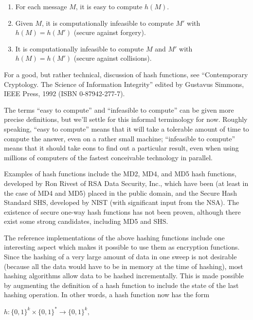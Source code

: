 \begin{enumerate}

    \item For each message $M$, it is easy to compute $h( M )$.

    \item Given $M$, it is computationally infeasible to compute $M'$ with
       $h( M ) = h( M' )$ (secure against forgery).

    \item It is computationally infeasible to compute $M$ and $M'$ with
       $h( M ) = h( M' )$ (secure against collisions).
\end{enumerate}

For a good, but rather technical, discussion of hash functions, see
``Contemporary Cryptology. The Science of Information Integrity'' edited by 
Gustavus Simmons, IEEE Press, 1992 (ISBN 0-87942-277-7).

The terms ``easy to compute'' and ``infeasible to compute'' can be given more
precise definitions, but we'll settle for this informal terminology for now.  
Roughly speaking, ``easy to compute'' means that it will take a tolerable amount 
of time to compute the answer, even on a rather small machine; ``infeasible to 
compute'' means that it should take eons to find out a particular result, even 
when using millions of computers of the fastest conceivable technology in 
parallel.

Examples of hash functions include the MD2, MD4, and MD5 hash functions,
developed by Ron Rivest of RSA Data Security, Inc., which have been (at least
in the case of MD4 and MD5) placed in the public domain, and the Secure Hash
Standard SHS, developed by NIST (with significant input from the NSA).  The
existence of secure one-way hash functions has not been proven, although there
exist some strong candidates, including MD5 and SHS.

The reference implementations of the above hashing functions include one
interesting aspect which makes it possible to use them as encryption functions.
Since the hashing of a very large amount of data in one sweep is not desirable
(because all the data would have to be in memory at the time of hashing), most
hashing algorithms allow data to be hashed incrementally.  This is made 
possible by augmenting the definition of a hash function to include the state 
of the last hashing operation.  In other words, a hash function now has the 
form

    $h : \{0,1\}^k \times \{0,1\}^* \rightarrow \{0,1\}^k,$

